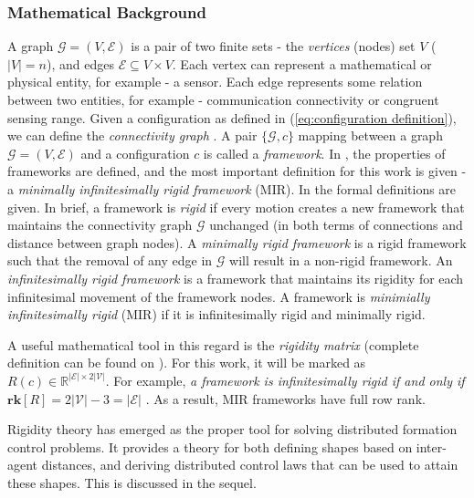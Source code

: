 \documentclass{iacas}
\begin{document}
\subsubsection{Mathematical Background}
A graph $\mathcal{G} = \left(V, \mathcal{E}\right)$ is a pair of two finite sets - the \emph{vertices} (nodes) set $V$ ($|V| = n$), and edges $\mathcal{E} \subseteq V\times V$. Each vertex can represent a mathematical or physical entity, for example - a sensor. Each edge represents some relation between two entities, for example - communication connectivity or congruent sensing range.
Given a configuration as defined in (\ref{eq:configuration definition}), we can define the \emph{connectivity graph} \cite{Muhammad2006}. A pair $\{\mathcal{G}, c\}$ mapping between a graph $\mathcal{G} = \left(V, \mathcal{E}\right)$ and a configuration $c$ is called a \emph{framework}. In \cite{Roth1979}, the properties of frameworks are defined, and the most important definition for this work is given - a \emph{minimally infinitesimally rigid framework} (MIR). In \cite{Muhammad2006} the formal definitions are given.
In brief, a framework is \emph{rigid} if every motion creates a new framework that maintains the connectivity graph $\mathcal{G}$ unchanged (in both terms of connections and distance between graph nodes). A \emph{minimally rigid framework} is a rigid framework such that the removal of any edge in $\mathcal{G}$ will result in a non-rigid framework. An \emph{infinitesimally rigid framework} is a framework that maintains its rigidity for each infinitesimal movement of the framework nodes. A framework is \emph{minimially infinitesimally rigid} (MIR) if it is infinitesimally rigid and minimally rigid.%

A useful mathematical tool in this regard is the \emph{rigidity matrix} (complete definition can be found on \cite{Krick2008}). For this work, it will be marked as $R(c) \in \mathbb{R}^{|\mathcal{E}| \times 2|\mathcal{V}|}$. For example, \emph{a framework is infinitesimally rigid if and only if $\mathbf{rk}\left[R\right] = 2|\mathcal{V} | -3 = |\mathcal{E}|$} \cite{Tay1984}. As a result, MIR frameworks have full row rank.

Rigidity theory has emerged as the proper tool for solving distributed formation control problems.  It provides a theory for both defining shapes based on inter-agent distances, and deriving distributed control laws that can be used to attain these shapes. This is discussed in the sequel. 
\end{document}
